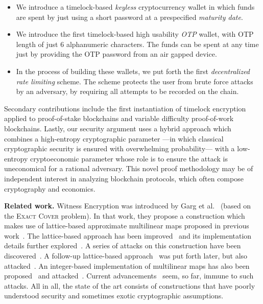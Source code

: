 \begin{itemize}
  \item We introduce a timelock-based \emph{keyless} cryptocurrency wallet in which funds are spent by
        just using a short password at a prespecified \emph{maturity date}.
  \item We introduce the first timelock-based high usability \emph{OTP} wallet, with OTP length of
        just 6 alphanumeric characters. The funds can be spent at any time just by
        providing the OTP password from an air gapped device.
  \item In the process of building these wallets, we put forth the first
        \emph{decentralized rate limiting} scheme. The scheme protects the user
        from brute force attacks by an adversary, by requiring all attempts to
        be recorded on the chain.
\end{itemize}

Secondary contributions include the first instantiation of timelock encryption applied
to proof-of-stake blockchains and variable difficulty proof-of-work blockchains. Lastly,
our security argument uses a hybrid approach which combines a high-entropy
cryptographic parameter ---in which classical cryptographic security is ensured with overwhelming
probability--- with a low-entropy cryptoeconomic parameter whose role is to ensure the
attack is uneconomical for a rational adversary. This novel proof methodology may be of
independent interest in analyzing blockchain protocols, which often compose cryptography
and economics.

\noindent
\textbf{Related work.}
Witness Encryption was introduced by Garg et al.~\cite{STOC:GGSW13} (based on the \textsc{Exact
Cover} problem). In that
work, they propose a construction which makes use of lattice-based approximate multilinear
maps proposed in previous work~\cite{EC:GarGenHal13}. The lattice-based approach has been
improved~\cite{EC:LanSteSte14} and its implementation details further explored~\cite{AC:ACLL15}.
A series of attacks on this construction have been discovered~\cite{EC:CHLRS15,EC:HuJia16,PKC:CLLT17,C:CGHLMM15,C:AlbBaiDuc16,EPRINT:CheJeoLee16}.
A follow-up lattice-based approach~\cite{TCC:GenGorHal15} was put forth later, but also attacked~\cite{C:CLLT16}.
An integer-based implementation of multilinear maps has also been proposed~\cite{C:CorLepTib13,C:CorLepTib15} and
attacked~\cite{EC:CHLRS15,EPRINT:MinFou15,EPRINT:CheLeeRyu15}.
Current advancements~\cite{ma2018mmap} seem, so far, immune to such attacks.
All in all, the state of the art consists of constructions that have poorly
understood security and sometimes exotic cryptographic assumptions.

